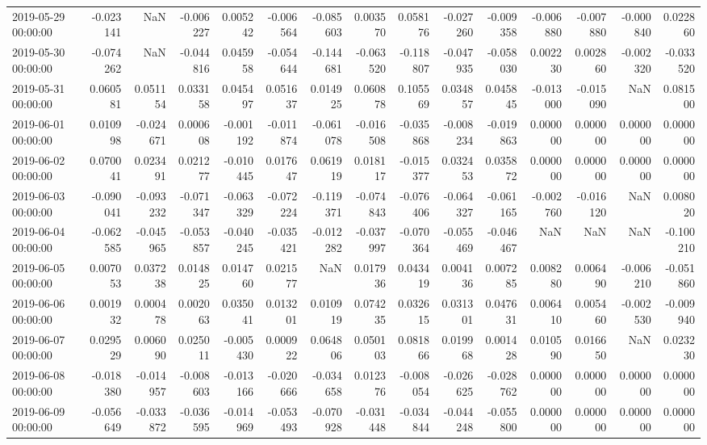\begin{tabular}{lrrrrrrrrrrrrrr}
2019-05-29 00:00:00 & -0.023141 & NaN & -0.006227 & 0.005242 & -0.006564 & -0.085603 & 0.003570 & 0.058176 & -0.027260 & -0.009358 & -0.006880 & -0.007880 & -0.000840 & 0.022860 \\
2019-05-30 00:00:00 & -0.074262 & NaN & -0.044816 & 0.045958 & -0.054644 & -0.144681 & -0.063520 & -0.118807 & -0.047935 & -0.058030 & 0.002230 & 0.002860 & -0.002320 & -0.033520 \\
2019-05-31 00:00:00 & 0.060581 & 0.051154 & 0.033158 & 0.045497 & 0.051637 & 0.014925 & 0.060878 & 0.105569 & 0.034857 & 0.045845 & -0.013000 & -0.015090 & NaN & 0.081500 \\
2019-06-01 00:00:00 & 0.010998 & -0.024671 & 0.000608 & -0.001192 & -0.011874 & -0.061078 & -0.016508 & -0.035868 & -0.008234 & -0.019863 & 0.000000 & 0.000000 & 0.000000 & 0.000000 \\
2019-06-02 00:00:00 & 0.070041 & 0.023491 & 0.021277 & -0.010445 & 0.017647 & 0.061919 & 0.018117 & -0.015377 & 0.032453 & 0.035872 & 0.000000 & 0.000000 & 0.000000 & 0.000000 \\
2019-06-03 00:00:00 & -0.090041 & -0.093232 & -0.071347 & -0.063329 & -0.072224 & -0.119371 & -0.074843 & -0.076406 & -0.064327 & -0.061165 & -0.002760 & -0.016120 & NaN & 0.008020 \\
2019-06-04 00:00:00 & -0.062585 & -0.045965 & -0.053857 & -0.040245 & -0.035421 & -0.012282 & -0.037997 & -0.070364 & -0.055469 & -0.046467 & NaN & NaN & NaN & -0.100210 \\
2019-06-05 00:00:00 & 0.007053 & 0.037238 & 0.014825 & 0.014760 & 0.021577 & NaN & 0.017936 & 0.043419 & 0.004136 & 0.007285 & 0.008280 & 0.006490 & -0.006210 & -0.051860 \\
2019-06-06 00:00:00 & 0.001932 & 0.000478 & 0.002063 & 0.035041 & 0.013201 & 0.010919 & 0.074235 & 0.032615 & 0.031301 & 0.047631 & 0.006410 & 0.005460 & -0.002530 & -0.009940 \\
2019-06-07 00:00:00 & 0.029529 & 0.006090 & 0.025011 & -0.005430 & 0.000922 & 0.064806 & 0.050103 & 0.081866 & 0.019968 & 0.001428 & 0.010590 & 0.016650 & NaN & 0.023230 \\
2019-06-08 00:00:00 & -0.018380 & -0.014957 & -0.008603 & -0.013166 & -0.020666 & -0.034658 & 0.012376 & -0.008054 & -0.026625 & -0.028762 & 0.000000 & 0.000000 & 0.000000 & 0.000000 \\
2019-06-09 00:00:00 & -0.056649 & -0.033872 & -0.036595 & -0.014969 & -0.053493 & -0.070928 & -0.031448 & -0.034844 & -0.044248 & -0.055800 & 0.000000 & 0.000000 & 0.000000 & 0.000000 \\

\end{tabular}
